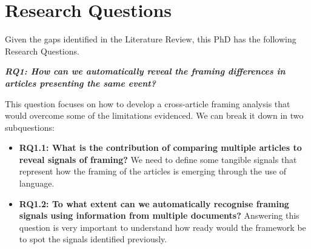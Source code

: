 \chapter{Research Questions}
\label{chap:research_questions}


Given the gaps identified in the Literature Review, this PhD has the following Research Questions.

\vspace{12px}

\textit{\textbf{RQ1: How can we automatically reveal the framing differences in articles presenting the same event?}}

\vspace{12px}

This question focuses on how to develop a cross-article framing analysis that would overcome some of the limitations evidenced.
We can break it down in two subquestions:

\begin{itemize}
    
    \item \textbf{RQ1.1: What is the contribution of comparing multiple articles to reveal signals of framing?} We need to define some tangible signals that represent how the framing of the articles is emerging through the use of language. %
    
    
    \item \textbf{RQ1.2: To what extent can we automatically recognise framing signals using information from multiple documents?}
    Answering this question is very important to understand how ready would the framework be to spot the signals identified previously. %
    
\end{itemize}


